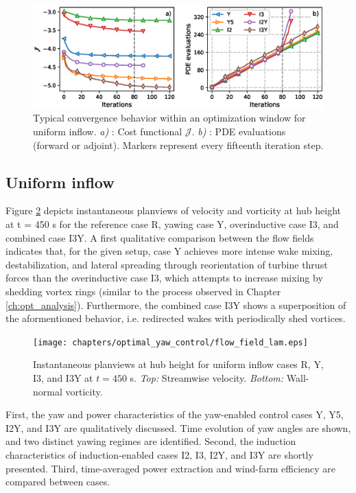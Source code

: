 \begin{figure}
	\includegraphics[width=\textwidth]{chapters/optimal_yaw_control/convergence_cost_pde.eps}
	\caption{Typical convergence behavior within an optimization window for uniform inflow. \emph{a) }: Cost functional $\mathscr{J}$. \emph{b) }: PDE evaluations (forward or adjoint). Markers represent every fifteenth iteration step.\label{fig:convergence}}
\end{figure}

\subsection{Uniform inflow}\label{sec:opt_yaw_uniform}

	Figure \ref{fig:flowfield_uniform} depicts instantaneous planviews of velocity and vorticity at hub height at t = 450 s for the reference case R, yawing case Y, overinductive case I3, and combined case I3Y. A first qualitative comparison between the flow fields indicates that, for the given setup, case Y achieves more intense wake mixing, destabilization, and lateral spreading through reorientation of turbine thrust forces than the overinductive case I3, which attempts to increase mixing by shedding vortex rings (similar to the process observed in Chapter \ref{ch:opt_analysis}). Furthermore, the combined case I3Y shows a superposition of the aformentioned behavior, i.e. redirected wakes with periodically shed vortices. 
	
	\begin{figure}
		\texttt{[image: chapters/optimal\_yaw\_control/flow\_field\_lam.eps]}
		\caption{Instantaneous planviews at hub height for uniform inflow cases R, Y, I3, and I3Y at $t= 450$ s. \emph{Top: } Streamwise velocity. \emph{Bottom: } Wall-normal vorticity. \label{fig:flowfield_uniform}}
	\end{figure}
	
	First, the yaw and power characteristics of the yaw-enabled control cases Y, Y5, I2Y, and I3Y are qualitatively discussed. Time evolution of yaw angles are shown, and two distinct yawing regimes are identified. Second, the induction characteristics of induction-enabled cases I2, I3, I2Y, and I3Y are shortly presented. Third, time-averaged power extraction and wind-farm efficiency are compared between cases. 
	
